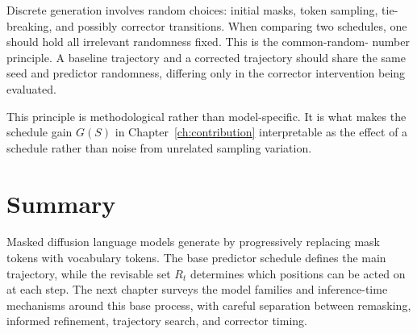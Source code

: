 Discrete generation involves random choices: initial masks, token sampling,
tie-breaking, and possibly corrector transitions. When comparing two schedules,
one should hold all irrelevant randomness fixed. This is the common-random-
number principle. A baseline trajectory and a corrected trajectory should share
the same seed and predictor randomness, differing only in the corrector
intervention being evaluated.

This principle is methodological rather than model-specific. It is what makes
the schedule gain $G(S)$ in Chapter~\ref{ch:contribution} interpretable as the
effect of a schedule rather than noise from unrelated sampling variation.

\section{Summary}
\label{sec:ch3-summary}

Masked diffusion language models generate by progressively replacing mask
tokens with vocabulary tokens. The base predictor schedule defines the main
trajectory, while the revisable set $R_t$ determines which positions can be
acted on at each step. The next chapter surveys the model families and
inference-time mechanisms around this base process, with careful separation
between remasking, informed refinement, trajectory search, and corrector
timing.

